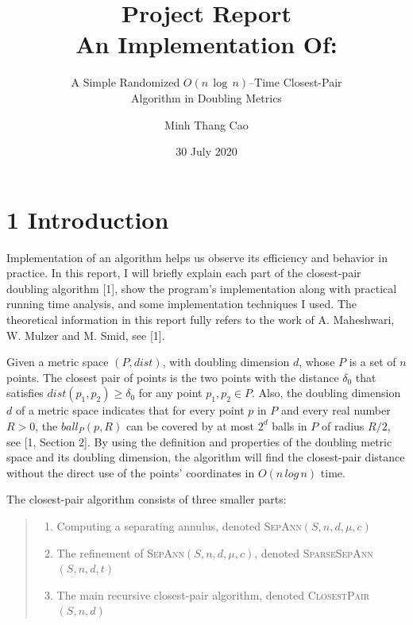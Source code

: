 \documentclass[12pt,english,]{article}
\title{\textbf{Project Report}\\
\Large{An Implementation Of:}}
\subtitle{A Simple Randomized \(O(n\,\log\, n)\)--Time Closest-Pair\\
Algorithm in Doubling Metrics}
\author{Minh Thang Cao}
\date{30 July 2020}
\begin{document}
\maketitle

\hypertarget{section1}{%
\section{\texorpdfstring{1
\enspace Introduction}{1 Introduction}}\label{section1}}

Implementation of an algorithm helps us observe its efficiency and
behavior in practice. In this report, I will briefly explain each part
of the closest-pair doubling algorithm {[}1{]}, show the program's
implementation along with practical running time analysis, and some
implementation techniques I used. The theoretical information in this
report fully refers to the work of A. Maheshwari, W. Mulzer and M. Smid,
see {[}1{]}.

Given a metric space \((P,dist)\), with doubling dimension \(d\), whose
\(P\) is a set of \(n\) points. The closest pair of points is the two
points with the distance \(\delta_0\) that satisfies
\(dist(p_1, p_2) \geq \delta_0\) for any point \(p_1, p_2 \in P\). Also,
the doubling dimension \(d\) of a metric space indicates that for every
point \(p\) in \(P\) and every real number \(R > 0\), the
\(ball_P(p, R)\) can be covered by at most \(2^d\) balls in \(P\) of
radius \(R/2\), see {[}1, Section 2{]}. By using the definition and
properties of the doubling metric space and its doubling dimension, the
algorithm will find the closest-pair distance without the direct use of
the points' coordinates in \(O(n\,log\,n)\) time.

The closest-pair algorithm consists of three smaller parts:

\vspace{-2.5truemm}

\begin{quote}
\begin{enumerate}
\item Computing a separating annulus, denoted \textsc{SepAnn}$(S,n,d,\mu,c)$
\item The refinement of \textsc{SepAnn}$(S,n,d,\mu,c)$, denoted \textsc{SparseSepAnn}$(S,n,d,t)$
\item The main recursive closest-pair algorithm, denoted \textsc{ClosestPair}$(S,n,d)$
\end{enumerate}
\end{quote}
\end{document}
